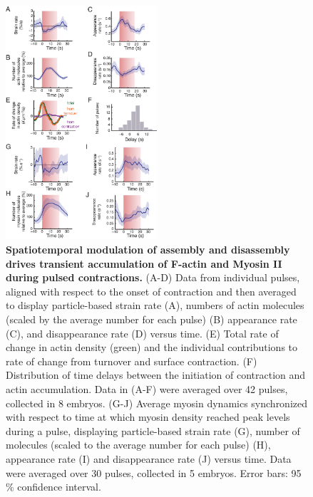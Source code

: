 \begin{figure}[!htbp]
\centering
\includegraphics[width=0.5\textwidth]{pulse/Figure2-3}

\caption{\label{fig:223} \textbf{Spatiotemporal modulation of assembly and disassembly drives transient accumulation of F-actin and Myosin II during pulsed contractions.} (A-D) Data from individual pulses, aligned with respect to the onset of contraction and then averaged to display particle-based strain rate (A), numbers of actin molecules (scaled by the average number for each pulse) (B) appearance rate (C), and disappearance rate (D) versus time.  (E) Total rate of change in actin density (green) and the individual contributions to rate of change from turnover and surface contraction. (F) Distribution of time delays between the initiation of contraction and actin accumulation. Data in (A-F) were averaged over 42 pulses, collected in 8 embryos. (G-J) Average myosin dynamics synchronized with respect to time at which myosin density reached peak levels during a pulse, displaying particle-based strain rate (G), number of molecules (scaled to the average number for each pulse) (H), appearance rate (I) and disappearance rate (J) versus time. Data were averaged over 30 pulses, collected in 5 embryos. Error bars: 95$\%$ confidence interval. }
\end{figure}



